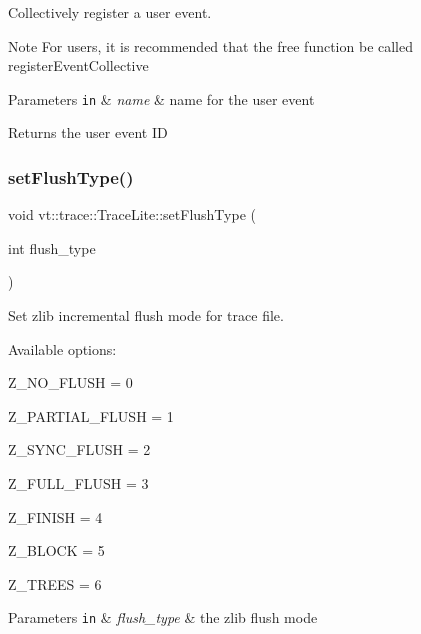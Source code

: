 Collectively register a user event. 

\begin{DoxyNote}{Note}
For users, it is recommended that the free function be called {\ttfamily register\+Event\+Collective} 
\end{DoxyNote}

\begin{DoxyParams}[1]{Parameters}
\mbox{\tt in}  & {\em name} & name for the user event\\
\hline
\end{DoxyParams}
\begin{DoxyReturn}{Returns}
the user event ID 
\end{DoxyReturn}
\mbox{\label{structvt_1_1trace_1_1_trace_lite_a8f9ba027397787cf6b580e397d8da484}} 
\subsubsection{\texorpdfstring{set\+Flush\+Type()}{setFlushType()}}
{\footnotesize\ttfamily void vt\+::trace\+::\+Trace\+Lite\+::set\+Flush\+Type (\begin{DoxyParamCaption}\item[{int}]{flush\+\_\+type }\end{DoxyParamCaption})}



Set zlib incremental flush mode for trace file. 

Available options\+:
\begin{DoxyItemize}
\item Z\+\_\+\+N\+O\+\_\+\+F\+L\+U\+SH = 0
\item Z\+\_\+\+P\+A\+R\+T\+I\+A\+L\+\_\+\+F\+L\+U\+SH = 1
\item Z\+\_\+\+S\+Y\+N\+C\+\_\+\+F\+L\+U\+SH = 2
\item Z\+\_\+\+F\+U\+L\+L\+\_\+\+F\+L\+U\+SH = 3
\item Z\+\_\+\+F\+I\+N\+I\+SH = 4
\item Z\+\_\+\+B\+L\+O\+CK = 5
\item Z\+\_\+\+T\+R\+E\+ES = 6
\end{DoxyItemize}


\begin{DoxyParams}[1]{Parameters}
\mbox{\tt in}  & {\em flush\+\_\+type} & the zlib flush mode \\
\hline
\end{DoxyParams}
\mbox{\label{structvt_1_1trace_1_1_trace_lite_a1f8e52289799bcd6b469b20be7d1e149}} 
